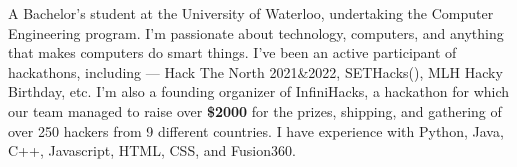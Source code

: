 

\begin{cvparagraph}

A Bachelor's student at the University of Waterloo, undertaking the Computer Engineering program. I'm passionate about technology, computers, and anything that makes computers do smart things. I've been an active participant of hackathons, including — Hack The North 2021\&2022, SETHacks(), MLH Hacky Birthday, etc. I'm also a founding organizer of InfiniHacks, a hackathon for which our team managed to raise over \textbf{\$2000} for the prizes, shipping, and gathering of over 250 hackers from 9 different countries. I have experience with Python, Java, C++, Javascript, HTML, CSS, and Fusion360.
\end{cvparagraph}